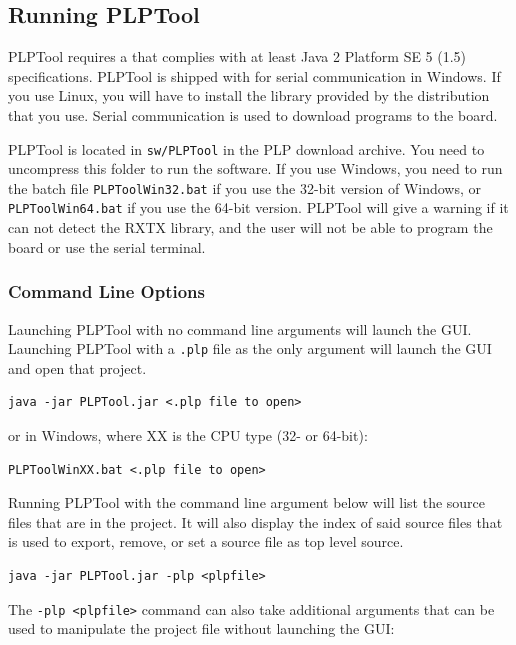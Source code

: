 \documentclass{article}
\begin{document}
\subsection{Running PLPTool}
PLPTool requires a 
that complies with at least Java 2 Platform SE 5 (1.5) specifications. PLPTool 
is shipped with 
for serial communication in Windows. If you use Linux, you will have to 
install the library provided by the distribution that you use. Serial 
communication is used to download programs to the board.

PLPTool is located in \verb+sw/PLPTool+ in the PLP download archive. You 
need to uncompress this folder to run the software. If you use Windows, you 
need to run the batch file \verb+PLPToolWin32.bat+ if you use the 32-bit 
version of Windows, or \verb+PLPToolWin64.bat+ if you use the 64-bit version. 
PLPTool will give a 
warning if it can not detect the RXTX library, and the user will not be 
able to program the board or use the serial terminal. 
\subsubsection{Command Line Options}
Launching PLPTool with no command line arguments will launch the GUI. Launching PLPTool with a \verb+.plp+ file as the only argument will launch the GUI and 
open that project.

\begin{verbatim}
java -jar PLPTool.jar <.plp file to open>
\end{verbatim}

or in Windows, where XX is the CPU type (32- or 64-bit):

\begin{verbatim}
PLPToolWinXX.bat <.plp file to open>
\end{verbatim}

Running PLPTool with the command line argument below will list the source files that are in the project. It will also display the index of said source files that is used to export, remove, or set a source file as top level source.

\begin{verbatim}
java -jar PLPTool.jar -plp <plpfile>
\end{verbatim}

The \verb+-plp <plpfile>+ command can also take additional arguments that can be used to manipulate the project file without launching the GUI: 
\end{document}
